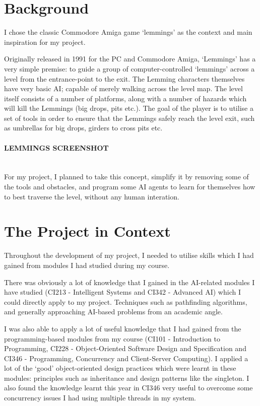 \documentclass[a4paper,oneside]{report}
\begin{document}
\section{Background}

I chose the classic Commodore Amiga game `lemmings' as the context and main inspiration for my project.

Originally released in 1991 for the PC and Commodore Amiga, `Lemmings' has a very simple premise: to guide a group of computer-controlled `lemmings’ across a level from the entrance-point to the exit. The Lemming characters themselves have very basic AI; capable of merely walking across the level map. The level itself consists of a number of platforms, along with a number of hazards which will kill the Lemmings (big drops, pits etc.). The goal of the player is to utilise a set of tools in order to ensure that the Lemmings safely reach the level exit, such as umbrellas for big drops, girders to cross pits etc. 

\paragraph{LEMMINGS SCREENSHOT}\ \\

For my project, I planned to take this concept, simplify it by removing some of the tools and obstacles, and program some AI agents to learn for themselves how to best traverse the level, without any human interation.
		
\section{The Project in Context}
	
Throughout the development of my project, I needed to utilise skills which I had gained from modules I had studied during my course.

There was obviously a lot of knowledge that I gained in the AI-related modules I have studied (CI213 - Intelligent Systems and CI342 - Advanced AI) which I could directly apply to my project. Techniques such as pathfinding algorithms, and generally approaching AI-based problems from an academic angle.

I was also able to apply a lot of useful knowledge that I had gained from the programming-based modules from my course (CI101 - Introduction to Programming, CI228 - Object-Oriented Software Design and Specification and CI346 - Programming, Concurrency and Client-Server Computing). I applied a lot of the `good' object-oriented design practices which were learnt in these modules: principles such as inheritance and design patterns like the singleton. I also found the knowledge learnt this year in CI346 very useful to overcome some concurrency issues I had using multiple threads in my system.
\end{document}
